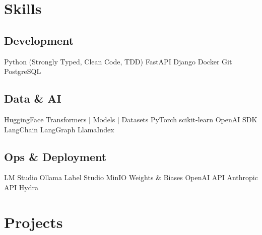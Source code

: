 \documentclass[]{deedy-resume-openfont}
\begin{document}
\begin{minipage}[t]{0.4\textwidth}

\section{Skills}
\subsection{Development}
Python (Strongly Typed, Clean Code, TDD) \textbullet{} FastAPI \textbullet{} Django \textbullet{} Docker \textbullet{} Git \textbullet{} PostgreSQL \\
\sectionsep

\subsection{Data \& AI}
HuggingFace Transformers | Models | Datasets \textbullet{} PyTorch \textbullet{} scikit-learn \textbullet{} OpenAI SDK \textbullet{} LangChain \textbullet{} LangGraph \textbullet{} LlamaIndex \textbullet{} \\
\sectionsep

\subsection{Ops \& Deployment}
LM Studio \textbullet{} Ollama \textbullet{} Label Studio \textbullet{} MinIO \textbullet{} Weights \& Biases \textbullet{} OpenAI API \textbullet{} Anthropic API \textbullet{} Hydra \textbullet{} 


\section{Projects}

\sectionsep
{}


%

\end{minipage} 
\end{document}
